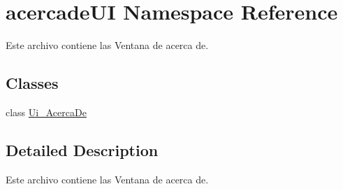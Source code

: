 \hypertarget{namespaceacercade_u_i}{\section{acercade\-U\-I Namespace Reference}
\label{namespaceacercade_u_i}
}


Este archivo contiene las Ventana de acerca de.  


\subsection*{Classes}
\begin{DoxyCompactItemize}
\item 
class \hyperlink{classacercade_u_i_1_1_ui___acerca_de}{Ui\-\_\-\-Acerca\-De}
\end{DoxyCompactItemize}


\subsection{Detailed Description}
Este archivo contiene las Ventana de acerca de. 